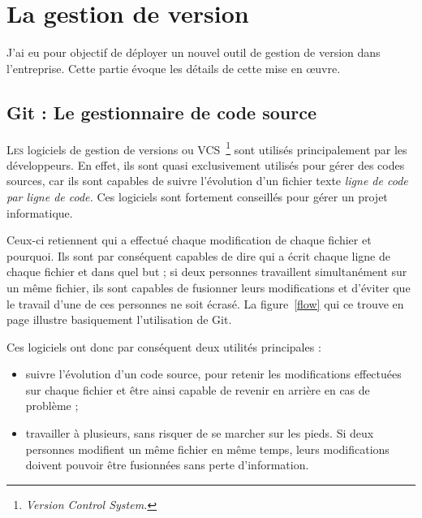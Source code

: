\chapter{La gestion de version} %
\label{cha:La gestion de version}

\begin{it}
J'ai eu pour objectif de déployer un nouvel outil de gestion de version
dans l'entreprise. Cette partie évoque les détails de cette mise en
\oe{}uvre.
\end{it}

\section{Git : Le gestionnaire de code source} %
\label{sec:Git : Le gestionnaire de code source}

\lettrine{L}{es} logiciels de gestion de versions ou VCS\,
\footnote{\emph{Version Control System.}} sont utilisés principalement
par les développeurs. En effet, ils sont quasi exclusivement utilisés
pour gérer des codes sources, car ils sont capables de suivre
l’évolution d’un fichier texte \emph{ligne de code par ligne de code.}
Ces logiciels sont fortement conseillés pour gérer un projet
informatique.

Ceux-ci retiennent qui a effectué chaque modification de chaque fichier
et pourquoi. Ils sont par conséquent capables de dire qui a écrit chaque
ligne de chaque fichier et dans quel but ; si deux personnes travaillent
simultanément sur un même fichier, ils sont capables de fusionner leurs
modifications et d’éviter que le travail d’une de ces personnes ne soit
écrasé. La figure~\ref{flow} qui ce trouve en page \pageref{flow}
illustre basiquement l'utilisation de Git.

Ces logiciels ont donc par conséquent deux utilités principales :
\begin{itemize}

  \item suivre l’évolution d’un code source, pour retenir les
    modifications effectuées sur chaque fichier et être ainsi capable de
    revenir en arrière en cas de problème ;

  \item travailler à plusieurs, sans risquer de se marcher sur les
    pieds.  Si deux personnes modifient un même fichier en même temps,
    leurs modifications doivent pouvoir être fusionnées sans perte
    d’information.

\end{itemize}

